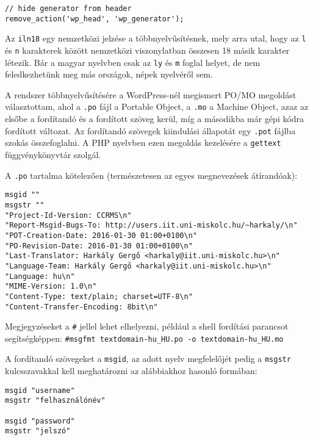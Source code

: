 \begin{lstlisting}
// hide generator from header
remove_action('wp_head', 'wp_generator');
\end{lstlisting}

\newpage


Az \texttt{iln18} egy nemzetközi jelzése a többnyelvűsítésnek, mely arra utal, hogy az \texttt{l} és \texttt{n} karakterek között nemzetközi viszonylatban összesen 18 másik karakter létezik. Bár a magyar nyelvben csak az \verb|ly| és \verb|m| foglal helyet, de nem feledkezhetünk meg más országok, népek nyelvéről sem.

A rendszer többnyelvűsítésére a WordPress-nél megismert PO/MO megoldást választottam, ahol a \texttt{.po} fájl a Portable Object, a \texttt{.mo} a Machine Object, azaz az elsőbe a fordítandó és a fordított szöveg kerül, míg a másodikba már gépi kódra fordított változat. Az fordítandó szövegek kiindulási állapotát egy \texttt{.pot} fájlba szokás összefoglalni. A PHP nyelvben ezen megoldás kezelésére a \texttt{gettext} függvénykönyvtár szolgál.

A \texttt{.po} tartalma kötelezően (természetesen az egyes megnevezések átírandóak):

\begin{lstlisting}
msgid ""
msgstr ""
"Project-Id-Version: CCRMS\n"
"Report-Msgid-Bugs-To: http://users.iit.uni-miskolc.hu/~harkaly/\n"
"POT-Creation-Date: 2016-01-30 01:00+0100\n"
"PO-Revision-Date: 2016-01-30 01:00+0100\n"
"Last-Translator: Harkály Gergő <harkaly@iit.uni-miskolc.hu>\n"
"Language-Team: Harkály Gergő <harkaly@iit.uni-miskolc.hu>\n"
"Language: hu\n"
"MIME-Version: 1.0\n"
"Content-Type: text/plain; charset=UTF-8\n"
"Content-Transfer-Encoding: 8bit\n"
\end{lstlisting}

Megjegyzéseket a \texttt{\#} jellel lehet elhelyezni, például a shell fordítási parancsot segítségképpen: \texttt{\#msgfmt textdomain-hu\_HU.po -o textdomain-hu\_HU.mo}

A fordítandó szövegeket a \texttt{msgid}, az adott nyelv megfelelőjét pedig a \texttt{msgstr} kulcsszavakkal kell meghatározni az alábbiakhoz hasonló formában:

\begin{lstlisting}
msgid "username"
msgstr "felhasználónév"

msgid "password"
msgstr "jelszó"
\end{lstlisting}

